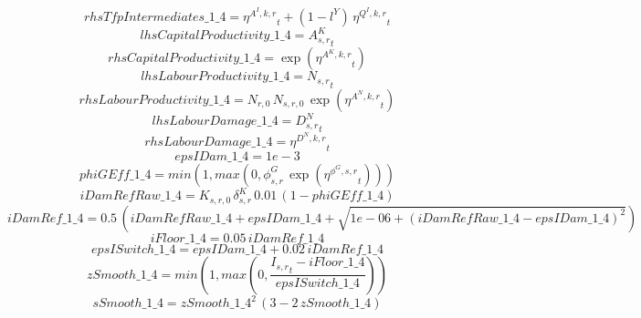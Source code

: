 \begin{dmath*}
rhsTfpIntermediates\_1\_4 = {{\eta^{A^{I},k,r}}}_{t}+\left(1-{{l^{Y}}}\right)\, {{\eta^{Q^{I},k,r}}}_{t}
\end{dmath*}
\begin{dmath*}
lhsCapitalProductivity\_1\_4 = {{A^{K}_{s,r}}}_{t}
\end{dmath*}
\begin{dmath*}
rhsCapitalProductivity\_1\_4 = \exp\left({{\eta^{A^{K},k,r}}}_{t}\right)
\end{dmath*}
\begin{dmath*}
lhsLabourProductivity\_1\_4 = {{N_{s,r}}}_{t}
\end{dmath*}
\begin{dmath*}
rhsLabourProductivity\_1\_4 = {{N_{r,0}}}\, {{N_{s,r,0}}}\, \exp\left({{\eta^{A^{N},k,r}}}_{t}\right)
\end{dmath*}
\begin{dmath*}
lhsLabourDamage\_1\_4 = {{D^N_{s,r}}}_{t}
\end{dmath*}
\begin{dmath*}
rhsLabourDamage\_1\_4 = {{\eta^{D^{N},k,r}}}_{t}
\end{dmath*}
\begin{dmath*}
epsIDam\_1\_4 = 1e-3
\end{dmath*}
\begin{dmath*}
phiGEff\_1\_4 = min(1,max(0,{{\phi^{G}_{s,r}}}\, \exp\left({{\eta^{\phi^{G},s,r}}}_{t}\right)))
\end{dmath*}
\begin{dmath*}
iDamRefRaw\_1\_4 = {{K_{s,r,0}}}\, {{\delta^{K}_{s,r}}}\, 0.01\, \left(1-{phiGEff\_1\_4}\right)
\end{dmath*}
\begin{dmath*}
iDamRef\_1\_4 = 0.5\, \left({iDamRefRaw\_1\_4}+{epsIDam\_1\_4}+\sqrt{1e-06+\left({iDamRefRaw\_1\_4}-{epsIDam\_1\_4}\right)^{2}}\right)
\end{dmath*}
\begin{dmath*}
iFloor\_1\_4 = 0.05\, {iDamRef\_1\_4}
\end{dmath*}
\begin{dmath*}
epsISwitch\_1\_4 = {epsIDam\_1\_4}+0.02\, {iDamRef\_1\_4}
\end{dmath*}
\begin{dmath*}
zSmooth\_1\_4 = min(1,max(0,\frac{{{I_{s,r}}}_{t}-{iFloor\_1\_4}}{{epsISwitch\_1\_4}}))
\end{dmath*}
\begin{dmath*}
sSmooth\_1\_4 = {zSmooth\_1\_4}^{2}\, \left(3-2\, {zSmooth\_1\_4}\right)
\end{dmath*}
